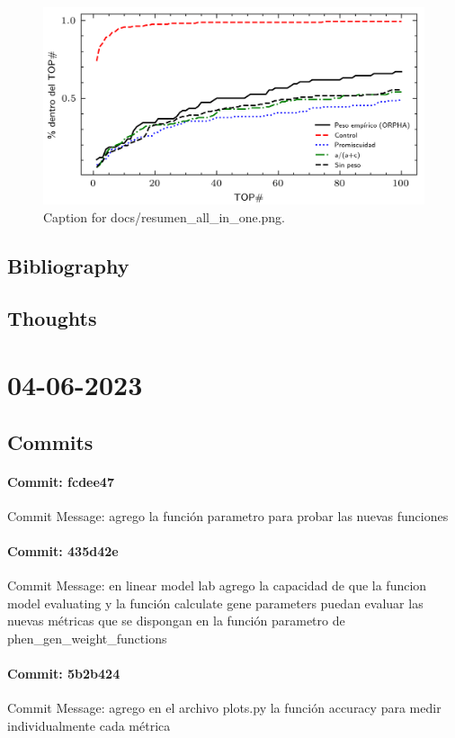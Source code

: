 \documentclass{article}
\begin{document}
\begin{figure}[h] \centering \includegraphics{docs/resumen_all_in_one.png} \caption{Caption for docs/resumen_all_in_one.png.} \end{figure}
\subsection{Bibliography}
\subsection{Thoughts}

\section{04-06-2023}
\subsection{Commits}
\paragraph{Commit: fcdee47}
Commit Message: agrego la función parametro para probar las nuevas funciones

\paragraph{Commit: 435d42e}
Commit Message: en linear model lab agrego la capacidad de que la funcion model evaluating y la función calculate gene parameters puedan evaluar las nuevas métricas que se dispongan en la función parametro de phen_gen_weight_functions

\paragraph{Commit: 5b2b424}
Commit Message: agrego en el archivo plots.py la función accuracy para medir individualmente cada métrica
\end{document}
